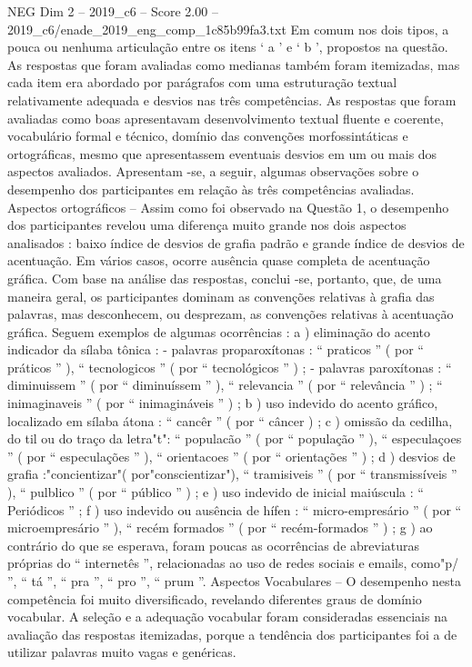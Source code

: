 \begin{textsample}{NEG Dim 2 – 2019\_c6 – Score 2.00 – 2019\_c6/enade\_2019\_eng\_comp\_1c85b99fa3.txt}
Em comum nos dois tipos, a pouca ou nenhuma articulação entre os itens ‘ a ’ e ‘ b ’, propostos na questão.
As respostas que foram avaliadas como medianas também foram itemizadas, mas cada item era abordado por parágrafos com uma estruturação textual relativamente adequada e desvios nas três competências.
As respostas que foram avaliadas como boas apresentavam desenvolvimento textual fluente e coerente, vocabulário formal e técnico, domínio das convenções morfossintáticas e ortográficas, mesmo que apresentassem eventuais desvios em um ou mais dos aspectos avaliados.
Apresentam -se, a seguir, algumas observações sobre o desempenho dos participantes em relação às três competências avaliadas.
Aspectos ortográficos – Assim como foi observado na Questão 1, o desempenho dos participantes revelou uma diferença muito grande nos dois aspectos analisados : baixo índice de desvios de grafia padrão e grande índice de desvios de acentuação.
Em vários casos, ocorre ausência quase completa de acentuação gráfica.
Com base na análise das respostas, conclui -se, portanto, que, de uma maneira geral, os participantes dominam as convenções relativas à grafia das palavras, mas desconhecem, ou desprezam, as convenções relativas à acentuação gráfica.
Seguem exemplos de algumas ocorrências : a ) eliminação do acento indicador da sílaba tônica : - palavras proparoxítonas : “ praticos ” ( por “ práticos ” ), “ tecnologicos ” ( por “ tecnológicos ” ) ; - palavras paroxítonas : “ diminuissem ” ( por “ diminuíssem ” ), “ relevancia ” ( por “ relevância ” ) ; “ inimaginaveis ” ( por “ inimagináveis ” ) ; b ) uso indevido do acento gráfico, localizado em sílaba átona : “ cancêr ” ( por “ câncer ) ; c ) omissão da cedilha, do til ou do traço da letra"t": “ populacão ” ( por “ população ” ), “ especulaçoes ” ( por “ especulações ” ), “ orientacoes ” ( por “ orientações ” ) ; d ) desvios de grafia :"concientizar"( por"conscientizar"), “ tramisiveis ” ( por “ transmissíveis ” ), “ pulblico ” ( por “ público ” ) ; e ) uso indevido de inicial maiúscula : “ Periódicos ” ; f ) uso indevido ou ausência de hífen : “ micro-empresário ” ( por “ microempresário ” ), “ recém formados ” ( por “ recém-formados ” ) ; g ) ao contrário do que se esperava, foram poucas as ocorrências de abreviaturas próprias do “ internetês ”, relacionadas ao uso de redes sociais e emails, como"p/ ”, “ tá ”, “ pra ”, “ pro ”, “ prum ”.
Aspectos Vocabulares – O desempenho nesta competência foi muito diversificado, revelando diferentes graus de domínio vocabular.
A seleção e a adequação vocabular foram consideradas essenciais na avaliação das respostas itemizadas, porque a tendência dos participantes foi a de utilizar palavras muito vagas e genéricas.

\end{textsample}
